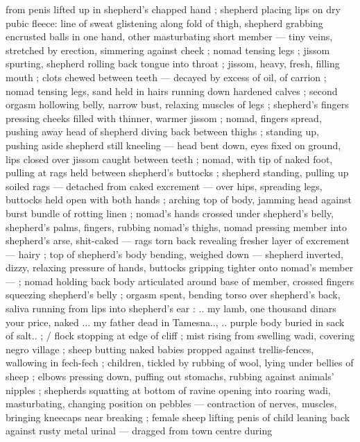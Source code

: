 \documentclass[10pt,twoside]{memoir}
\begin{document}
from penis lifted up in shepherd's chapped hand ; shepherd placing 
lips on dry pubic fleece: line of sweat glistening along fold of thigh, %
shepherd grabbing encrusted balls in one hand, other masturbating 
short member --- tiny veins, stretched by erection, simmering 
against cheek ; nomad tensing legs ; jissom spurting, shepherd 
rolling back tongue into throat ; jissom, heavy, fresh, filling mouth ; 
clots chewed between teeth --- decayed by excess of oil, of carrion 
; nomad tensing legs, sand held in hairs running down hardened 
calves ; second orgasm hollowing belly, narrow bust, relaxing 
muscles of legs ; shepherd's fingers pressing cheeks filled with 
thinner, warmer jissom ; nomad, fingers spread, pushing away head 
of shepherd diving back between thighs ; standing up, pushing aside 
shepherd still kneeling --- head bent down, eyes fixed on ground, 
lips closed over jissom caught between teeth ; nomad, with tip of 
naked foot, pulling at rags held between shepherd's buttocks ; 
shepherd standing, pulling up soiled rags --- detached from caked 
excrement --- over hips, spreading legs, buttocks held open with 
both hands ; arching top of body, jamming head against burst bundle 
of rotting linen ; nomad's hands crossed under shepherd's belly, 
shepherd's palms, fingers, rubbing nomad's thighs, nomad pressing 
member into shepherd's arse, shit-caked --- rags torn back revealing 
fresher layer of excrement --- hairy ; top of shepherd's body 
bending, weighed down --- shepherd inverted, dizzy, relaxing 
pressure of hands, buttocks gripping tighter onto nomad's member 
--- ; nomad holding back body articulated around base of member, 
crossed fingers squeezing shepherd's belly ; orgasm spent, bending 
torso over shepherd's back, saliva running from lips into shepherd's 
ear : {\gl} .. my lamb, one thousand dinars your price, naked ... my father %
dead in Tamesna..\thinspace, .. purple body buried in sack of salt.. {\gr} ; / flock 
stopping at edge of cliff ; mist rising from swelling wadi, covering 
negro village ; sheep butting naked babies propped against trellis-fences, 
wallowing in fech-fech ; children, tickled by rubbing of wool, 
lying under bellies of sheep ; elbows pressing down, puffing out 
stomachs, rubbing against animals' nipples ; shepherds squatting at 
bottom of ravine opening into roaring wadi, masturbating, changing 
position on pebbles --- contraction of nerves, muscles, bringing %
kneecaps near breaking ; female sheep lifting penis of child leaning 
back against rusty metal urinal --- dragged from town centre during 
\end{document}

